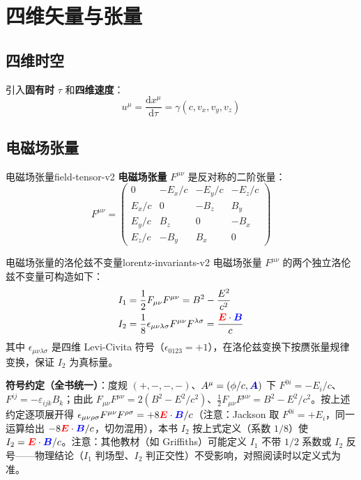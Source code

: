 \documentclass[11pt,a4paper,openany,oneside]{book}
\newcommand{\diff}{\mathrm{d}}
\newcommand{\vecE}{\textcolor{red}{\vect{E}}}
\newcommand{\vecB}{\textcolor{blue}{\vect{B}}}
\newcommand{\vecA}{\textcolor{blue!70!black}{\vect{A}}}
\newcommand{\vect}[1]{\bm{#1}}
\begin{document}
\section{四维矢量与张量}

\subsection{四维时空}

引入\textbf{固有时} $\tau$ 和\textbf{四维速度}：
\[
u^\mu = \frac{\diff x^\mu}{\diff\tau} = \gamma(c, v_x, v_y, v_z)
\]

\subsection{电磁场张量}

\begin{definition}{电磁场张量}{field-tensor-v2}
\textbf{电磁场张量} $F^{\mu\nu}$ 是反对称的二阶张量：
\[
F^{\mu\nu} = \begin{pmatrix}
0 & -E_x/c & -E_y/c & -E_z/c \\
E_x/c & 0 & -B_z & B_y \\
E_y/c & B_z & 0 & -B_x \\
E_z/c & -B_y & B_x & 0
\end{pmatrix}
\]
\end{definition}

\begin{theorem}{电磁场张量的洛伦兹不变量}{lorentz-invariants-v2}
电磁场张量 $F^{\mu\nu}$ 的两个独立洛伦兹不变量可构造如下：
\begin{align}
I_1 &= \frac{1}{2}F_{\mu\nu}F^{\mu\nu} = B^2 - \frac{E^2}{c^2} \label{eq:invariant1} \\
I_2 &= \frac{1}{8}\epsilon_{\mu\nu\lambda\sigma}F^{\mu\nu}F^{\lambda\sigma} = \frac{\vecE\cdot\vecB}{c} \label{eq:invariant2}
\end{align}
其中 $\epsilon_{\mu\nu\lambda\sigma}$ 是四维 Levi-Civita 符号（$\epsilon_{0123}=+1$），在洛伦兹变换下按赝张量规律变换，保证 $I_2$ 为真标量。

\textbf{符号约定（全书统一）}：度规 $(+,-,-,-)$、$A^\mu = (\phi/c, \vecA)$ 下 $F^{0i} = -E_i/c$、$F^{ij} = -\varepsilon_{ijk}B_k$；由此 $F_{\mu\nu}F^{\mu\nu} = 2(B^2 - E^2/c^2)$、$\frac12 F_{\mu\nu}F^{\mu\nu} = B^2 - E^2/c^2$。按上述约定逐项展开得 $\epsilon_{\mu\nu\rho\sigma}F^{\mu\nu}F^{\rho\sigma} = +8\vecE\cdot\vecB/c$（注意：Jackson 取 $F^{0i}=+E_i$，同一运算给出 $-8\vecE\cdot\vecB/c$，切勿混用），本书 $I_2$ 按上式定义（系数 $1/8$）使 $I_2 = \vecE\cdot\vecB/c$。注意：其他教材（如 Griffiths）可能定义 $I_1$ 不带 $1/2$ 系数或 $I_2$ 反号——物理结论（$I_1$ 判场型、$I_2$ 判正交性）不受影响，对照阅读时以定义式为准。
\end{theorem}
\end{document}
